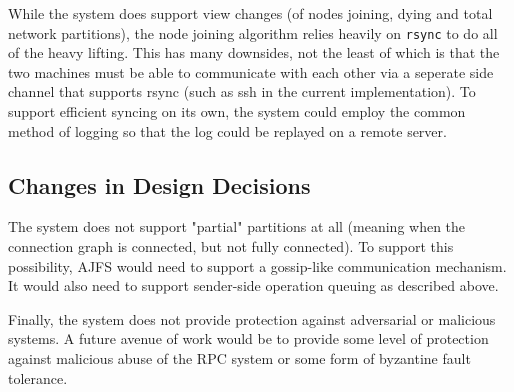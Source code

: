 While the system does support view changes (of nodes joining, dying and total
network partitions), the node joining algorithm relies heavily on \texttt{rsync}
to do all of the heavy lifting. This has many downsides, not the least of which
is that the two machines must be able to communicate with each other via a
seperate side channel that supports rsync (such as ssh in the current
implementation). To support efficient syncing on its own, the system could
employ the common method of logging so that the log could be replayed on a
remote server.

\subsection{Changes in Design Decisions}

The system does not support "partial" partitions at all (meaning when the
connection graph is connected, but not fully connected). To support this
possibility, AJFS would need to support a gossip-like communication mechanism.
It would also need to support sender-side operation queuing as described above.

Finally, the system does not provide protection against adversarial or malicious
systems. A future avenue of work would be to provide some level of protection
against malicious abuse of the RPC system or some form of byzantine fault
tolerance.
